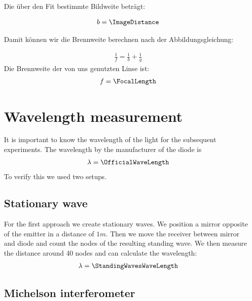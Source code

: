\documentclass[a4paper,10pt,twocolumn]{article}
\begin{document}
    
    Die über den Fit bestimmte Bildweite beträgt:
    
    \begin{align*}
        b = \ImageDistance
    \end{align*}

    Damit können wir die Brennweite berechnen nach der Abbildungsgleichung:
    
    \begin{align}
        \label{eq:LensFormula}
        \frac{1}{f} = \frac{1}{b} + \frac{1}{g}
    \end{align}
    Die Brennweite der von uns genutzten Linse ist:
    \begin{align*}
        f = \FocalLength
    \end{align*}
    
    \section{Wavelength measurement}
    It is important to know the wavelength of the light for the subsequent experiments.
    The wavelength by the manufacturer of the diode is
    \begin{align*}
        \lambda = \OfficialWaveLength
    \end{align*}
    To verify this we used two setups.
    \subsection{Stationary wave}
    For the first approach we create stationary waves.
    We position a mirror opposite of the emitter in a distance of $1m$.
    Then we move the receiver between mirror and diode and count the nodes of the resulting standing wave.
    We then measure the distance around 40 nodes and can calculate the wavelength:
    \begin{align*}
        \lambda = \StandingWavesWaveLength
    \end{align*}
    \subsection{Michelson interferometer}
\end{document}
